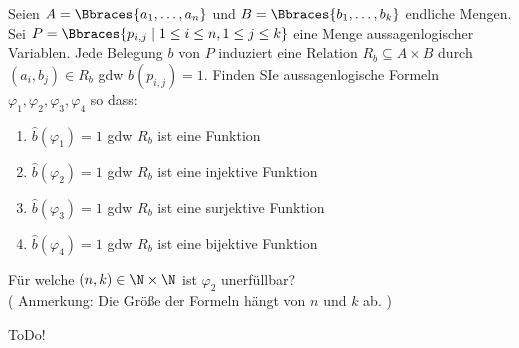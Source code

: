 
\begin{exercise}[48]

Seien $A = \Bbraces{a_1, \dots, a_n}$ und $B = \Bbraces{b_1, \dots, b_k}$ endliche Mengen.
Sei $P = \Bbraces{p_{i, j} \mid 1 \leq i \leq n, 1 \leq j \leq k}$ eine Menge aussagenlogischer Variablen.
Jede Belegung $b$ von $P$ induziert eine Relation $R_b \subseteq A \times B$ durch $(a_i, b_j) \in R_b$ gdw $b(p_{i, j}) = 1$.
Finden SIe aussagenlogische Formeln $\varphi_1, \varphi_2, \varphi_3, \varphi_4$ so dass:

\begin{enumerate}[label = \arabic*.]
    \item $\hat{b}(\varphi_1) = 1$ gdw $R_b$ ist eine Funktion
    \item $\hat{b}(\varphi_2) = 1$ gdw $R_b$ ist eine injektive Funktion
    \item $\hat{b}(\varphi_3) = 1$ gdw $R_b$ ist eine surjektive Funktion
    \item $\hat{b}(\varphi_4) = 1$ gdw $R_b$ ist eine bijektive Funktion
\end{enumerate}

Für welche $(n, k) \in \N \times \N$ ist $\varphi_2$ unerfüllbar? \\

(
    Anmerkung:
    Die Größe der Formeln hängt von $n$ und $k$ ab.
)

\end{exercise}


\begin{solution}

ToDo!

\end{solution}

